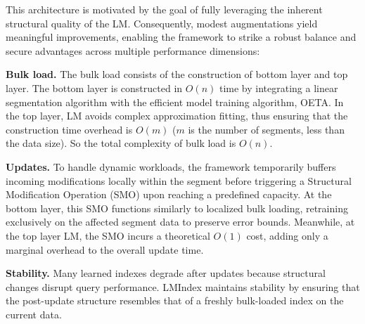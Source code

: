 

This architecture is motivated by the goal of fully leveraging the inherent structural quality of the LM. Consequently, modest augmentations yield meaningful improvements, enabling the framework to strike a robust balance and secure advantages across multiple performance dimensions:

\textbf{Bulk load.} The bulk load consists of the construction of bottom layer and top layer. The bottom layer is constructed in $O(n)$ time by integrating a linear segmentation algorithm with the efficient model training algorithm, OETA. In the top layer, LM avoids complex approximation fitting, thus ensuring that the construction time overhead is $O(m)$ ($m$ is the number of segments, less than the data size). So the total complexity of bulk load is $O(n)$.

\textbf{Updates.} To handle dynamic workloads, the framework temporarily buffers incoming modifications locally within the segment before triggering a Structural Modification Operation (SMO) upon reaching a predefined capacity. At the bottom layer, this SMO functions similarly to localized bulk loading, retraining exclusively on the affected segment data to preserve error bounds. Meanwhile, at the top layer LM, the SMO incurs a theoretical $O(1)$ cost, adding only a marginal overhead to the overall update time.

\textbf{Stability.} Many learned indexes degrade after updates because structural changes disrupt query performance. LMIndex maintains stability by ensuring that the post-update structure resembles that of a freshly bulk-loaded index on the current data.

